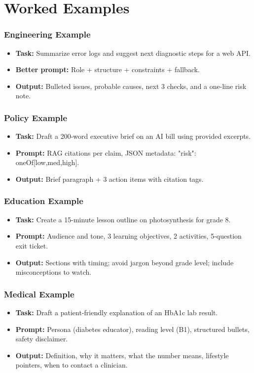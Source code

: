 \documentclass{beamer}
\begin{document}
\section{Worked Examples}

\begin{frame}
	\frametitle{Engineering Example}
	\begin{itemize}
		\item \textbf{Task:} Summarize error logs and suggest next diagnostic steps for a web API.
		\item \textbf{Better prompt:} Role + structure + constraints + fallback.
		\item \textbf{Output:} Bulleted issues, probable causes, next 3 checks, and a one-line risk note.
	\end{itemize}
\end{frame}

\begin{frame}
	\frametitle{Policy Example}
	\begin{itemize}
		\item \textbf{Task:} Draft a 200-word executive brief on an AI bill using provided excerpts.
		\item \textbf{Prompt:} RAG citations per claim, JSON metadata: {"risk": oneOf[low,med,high]}.
		\item \textbf{Output:} Brief paragraph + 3 action items with citation tags.
	\end{itemize}
\end{frame}

\begin{frame}
	\frametitle{Education Example}
	\begin{itemize}
		\item \textbf{Task:} Create a 15-minute lesson outline on photosynthesis for grade 8.
		\item \textbf{Prompt:} Audience and tone, 3 learning objectives, 2 activities, 5-question exit ticket.
		\item \textbf{Output:} Sections with timing; avoid jargon beyond grade level; include misconceptions to watch.
	\end{itemize}
\end{frame}

\begin{frame}
	\frametitle{Medical Example}
	\begin{itemize}
		\item \textbf{Task:} Draft a patient-friendly explanation of an HbA1c lab result.
		\item \textbf{Prompt:} Persona (diabetes educator), reading level (B1), structured bullets, safety disclaimer.
		\item \textbf{Output:} Definition, why it matters, what the number means, lifestyle pointers, when to contact a clinician.
	\end{itemize}
\end{frame}
\end{document}
